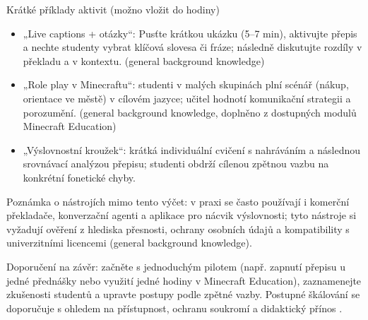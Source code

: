Krátké příklady aktivit (možno vložit do hodiny)
\begin{itemize}
  \item „Live captions + otázky“: Pusťte krátkou ukázku (5–7 min), aktivujte přepis a nechte studenty vybrat klíčová slovesa či fráze; následně diskutujte rozdíly v překladu a v kontextu. (general background knowledge)
  \item „Role play v Minecraftu“: studenti v malých skupinách plní scénář (nákup, orientace ve městě) v cílovém jazyce; učitel hodnotí komunikační strategii a porozumění. (general background knowledge, doplněno z dostupných modulů Minecraft Education) \cite{kb_ai_101_tipu_pdf_04e4a115_page_15_2}
  \item „Výslovnostní kroužek“: krátká individuální cvičení s nahráváním a následnou srovnávací analýzou přepisu; studenti obdrží cílenou zpětnou vazbu na konkrétní fonetické chyby.
\end{itemize}

Poznámka o nástrojích mimo tento výčet: v praxi se často používají i komerční překladače, konverzační agenti a aplikace pro nácvik výslovnosti; tyto nástroje si vyžadují ověření z hlediska přesnosti, ochrany osobních údajů a kompatibility s univerzitními licencemi (general background knowledge).

Doporučení na závěr: začněte s jednoduchým pilotem (např. zapnutí přepisu u jedné přednášky nebo využití jedné hodiny v Minecraft Education), zaznamenejte zkušenosti studentů a upravte postupy podle zpětné vazby. Postupné škálování se doporučuje s ohledem na přístupnost, ochranu soukromí a didaktický přínos \cite{kb_ai_101_tipu_pdf_04e4a115_page_15_2}.